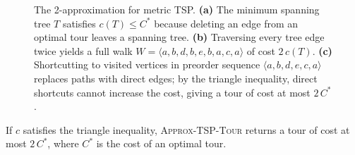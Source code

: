 \begin{figure}[h]
\caption{The 2-approximation for metric TSP. \textbf{(a)} The minimum spanning
tree $T$ satisfies $c(T) \le C^*$ because deleting an edge from an optimal tour
leaves a spanning tree. \textbf{(b)} Traversing every tree edge twice yields a
full walk $W = \langle a,b,d,b,e,b,a,c,a\rangle$ of cost $2\,c(T)$.
\textbf{(c)} Shortcutting to visited vertices in preorder sequence
$\langle a,b,d,e,c,a\rangle$ replaces paths with direct edges; by the triangle
inequality, direct shortcuts cannot increase the cost, giving a tour of cost
at most $2\,C^*$.}
\label{ch34:tsp-tree}
\end{figure}

\begin{theorem}
\label{ch34:tsp-thm}
If $c$ satisfies the triangle inequality, \textsc{Approx-TSP-Tour} returns a
tour of cost at most $2\,C^{*}$, where $C^{*}$ is the cost of an optimal tour.
\end{theorem}

